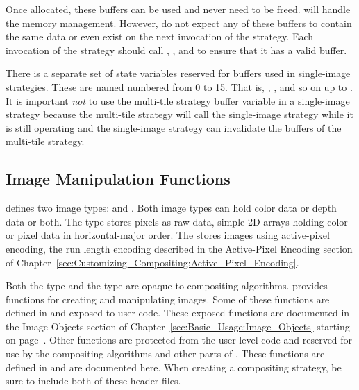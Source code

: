 Once allocated, these buffers can be used and never need to be freed.
\IceT will handle the memory management.  However, do not expect any of
these buffers to contain the same data or even exist on the next invocation
of the strategy.  Each invocation of the strategy should call
, , and
 to ensure that it has a valid buffer.

There is a separate set of state variables reserved for buffers used in
single-image strategies.  These are named
 numbered from 0 to 15.
That is, ,
, and so on up to
.  It is important \emph{not} to use
the multi-tile strategy buffer variable in a single-image strategy because
the multi-tile strategy will call the single-image strategy while it is
still operating and the single-image strategy can invalidate the buffers of
the multi-tile strategy.

\subsection{Image Manipulation Functions}

\IceT defines two image types:  and
.  Both image types can hold color data or depth
data or both.  The  type stores pixels as raw data, simple
2D arrays holding color or pixel data in horizontal-major order.  The
 stores images using
active-pixel encoding, the run length encoding
described in the Active-Pixel Encoding section of
Chapter~\ref{sec:Customizing_Compositing:Active_Pixel_Encoding}.

Both the  type and the  type are
opaque to compositing algorithms.  \IceT provides functions for creating
and manipulating images.  Some of these functions are defined in
 and exposed to user code.  These exposed
functions are documented in the Image Objects section of
Chapter~\ref{sec:Basic_Usage:Image_Objects} starting on
page~\pageref{sec:Basic_Usage:Image_Objects}.  Other functions are
protected from the user level code and reserved for use by the compositing
algorithms and other parts of \IceT.  These functions are defined in
 and are documented here.  When
creating a compositing strategy, be sure to include both of these header
files.

